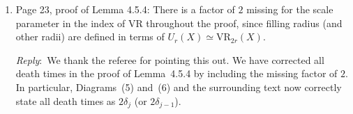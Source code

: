 \documentclass{amsart}
\newcommand{\ar}{\medskip\noindent\textit{Reply}:\ }
\begin{document}
\begin{enumerate}
		\smallskip

		We added the following sentences to \S4.1.4 to clarify the choice of coefficients for homological radius:

		\smallskip

		\begin{quote}
			Although the choice of \(\field\) does not affect the filling radius, it may affect the \(m\)-homological radius. 
			Throughtout, we follow the convention in \S4.1.2, and omit \(\field\) from the notation whenever it is clear from context.
		\end{quote}

		\smallskip

		In \S4.7, we clarified that $q$ is an odd prime and added the following reminder that we work with $\bF_q$ coefficients:
		
		\smallskip

		\begin{quote}
			The ground field here is $\bF_q$.
		\end{quote}



		\item Page 23, proof of Lemma 4.5.4: There is a factor of $2$ missing for the scale parameter in the index of $\mathrm{VR}$ throughout the proof, since filling radius (and other radii) are defined in terms of $U_r(X) \simeq \mathrm{VR}_{2r}(X)$.

		\ar We thank the referee for pointing this out. We have corrected all death times in the proof of Lemma~4.5.4 by including the missing factor of $2$. In particular, Diagrams~(5) and~(6) and the surrounding text now correctly state all death times as $2\delta_j$ (or $2\delta_{j-1}$).


\end{enumerate}
\end{document}
